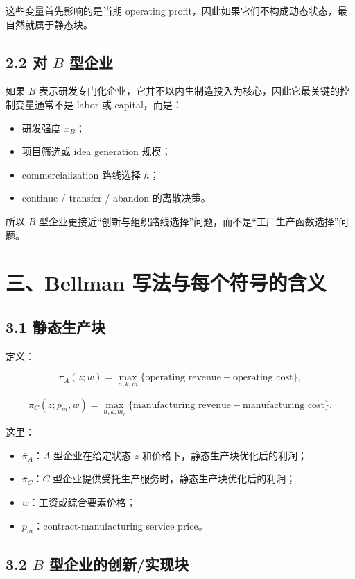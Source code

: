 \documentclass[12pt]{ctexart}
\begin{document}
这些变量首先影响的是当期 operating profit，因此如果它们不构成动态状态，最自然就属于静态块。

\subsection{2.2 对 \(B\) 型企业}

如果 \(B\) 表示研发专门化企业，它并不以内生制造投入为核心，因此它最关键的控制变量通常不是 labor 或 capital，而是：

\begin{itemize}[leftmargin=2em]
    \item 研发强度 \(x_B\)；
    \item 项目筛选或 idea generation 规模；
    \item commercialization 路线选择 \(h\)；
    \item continue / transfer / abandon 的离散决策。
\end{itemize}

所以 \(B\) 型企业更接近“创新与组织路线选择”问题，而不是“工厂生产函数选择”问题。

\section{三、Bellman 写法与每个符号的含义}

\subsection{3.1 静态生产块}

定义：

\[
\bar{\pi}_A(z;w)
=
\max_{n,k,m}
\{\text{operating revenue}-\text{operating cost}\},
\]

\[
\bar{\pi}_C(z;p_m,w)
=
\max_{n,k,m_c}
\{\text{manufacturing revenue}-\text{manufacturing cost}\}.
\]

这里：

\begin{itemize}[leftmargin=2em]
    \item \(\bar{\pi}_A\)：\(A\) 型企业在给定状态 \(z\) 和价格下，静态生产块优化后的利润；
    \item \(\bar{\pi}_C\)：\(C\) 型企业提供受托生产服务时，静态生产块优化后的利润；
    \item \(w\)：工资或综合要素价格；
    \item \(p_m\)：contract-manufacturing service price。
\end{itemize}

\subsection{3.2 \(B\) 型企业的创新/实现块}
\end{document}
